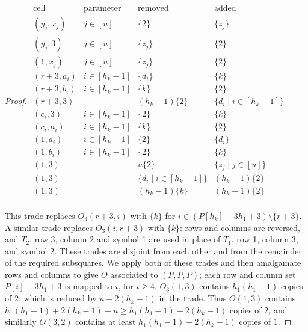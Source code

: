 \documentclass{sn-jnl}
\theoremstyle{definition}
\begin{document}
\begin{proof}
    $\begin{array}{c|c|c|c}
    \text{cell} & \text{parameter} & \text{removed} & \text{added} \\
    \hline
    (y_j,x_j) & j\in [u] & \{2\} & \{z_j\} \\
    (y_j,3) & j\in [u] & \{z_j\} & \{2\} \\
    (1,x_j) & j\in [u] & \{z_j\} & \{2\} \\
    (r+3,a_i) & i\in [h_k-1] & \{d_i\} & \{k\} \\
    (r+3,b_i) & i\in [h_k-1] & \{k\} & \{2\} \\
    (r+3,3) && (h_k-1)\{2\} & \{d_i \mid i \in [h_k-1]\} \\
    (c_i,3) & i\in [h_k-1] & \{2\} & \{k\} \\
    (c_i,a_i) & i\in [h_k-1] & \{k\} & \{2\} \\
    (1,a_i) & i\in [h_k-1] & \{2\} & \{d_i\} \\
    (1,b_i) & i\in [h_k-1] & \{2\} & \{k\} \\
    (1,3) & & u\{2\} & \{z_j \mid j\in [u] \} \\
    (1,3) & & \{d_i \mid i\in [h_k-1] \} & (h_k-1)\{2\}\\
    (1,3) & & (h_k-1)\{k\} & (h_k-1)\{2\} \\
\end{array}$
\newline

This trade replaces $O_3(r+3,i)$ with $\{k\}$ for $i\in (P[h_k]-3h_1+3) \setminus \{r+3\}$. A similar trade replaces $O_3(i,r+3)$ with $\{k\}$: rows and columns are reversed, and $T_2$, row 3, column 2 and symbol 1 are used in place of $T_1$, row 1, column 3, and symbol 2. These trades are disjoint from each other and from the remainder of the required subsquares. We apply both of these trades and then amalgamate rows and columns to give $O$ associated to $(P,P,P)$; each row and column set $P[i]-3h_1+3$ is mapped to $i$, for $i\ge 4$. $O_3(1,3)$ contains $h_1(h_1-1)$ copies of $2$, which is reduced by $u-2(h_k-1)$ in the trade. Thus $O(1,3)$ contains $h_1(h_1-1)+2(h_k-1)-u \ge h_1(h_1-1)-2(h_k-1)$ copies of $2$, and similarly $O(3,2)$ contains at least $h_1(h_1-1)-2(h_k-1)$ copies of $1$.

\end{proof}
\end{document}
